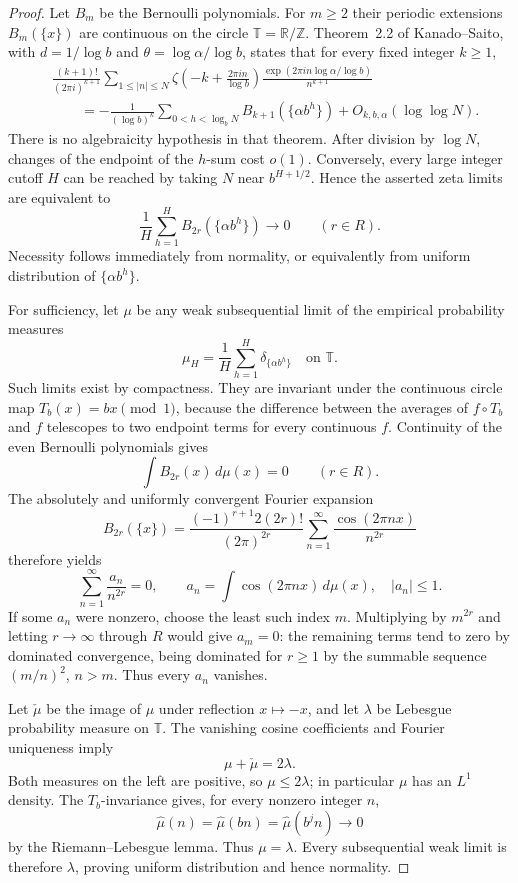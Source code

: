 \documentclass[11pt,a4paper]{article}
\theoremstyle{definition}
\theoremstyle{remark}
\numberwithin{equation}{section}
\begin{document}
\begin{proof}
Let $B_m$ be the Bernoulli polynomials.  For $m\geq2$ their periodic
extensions $B_m(\{x\})$ are continuous on the circle $\mathbb T=\mathbb R/\mathbb Z$.
Theorem~2.2 of Kanado--Saito, with
$d=1/\log b$ and $\theta=\log\alpha/\log b$, states that for every fixed
integer $k\geq1$,
\[
 \begin{aligned}
 &\frac{(k+1)!}{(2\pi i)^{k+1}}
 \sum_{1\leq|n|\leq N}
 \zeta\!\left(-k+\frac{2\pi i n}{\log b}\right)
 \frac{\exp(2\pi i n\log\alpha/\log b)}{n^{k+1}}
 \\
 &\qquad=-\frac1{(\log b)^k}
 \sum_{0<h<\log_bN}B_{k+1}(\{\alpha b^h\})
 +O_{k,b,\alpha}(\log\log N).
 \end{aligned}
\]
There is no algebraicity hypothesis in that theorem.
After division by $\log N$, changes of the endpoint of the $h$-sum cost
$o(1)$.  Conversely, every large integer cutoff $H$ can be reached by
taking $N$ near $b^{H+1/2}$.  Hence the asserted zeta limits are equivalent
to
\[
 \frac1H\sum_{h=1}^{H}B_{2r}(\{\alpha b^h\})\longrightarrow0
 \qquad(r\in R).
\]
Necessity follows immediately from normality, or equivalently from uniform
distribution of $\{\alpha b^h\}$.

For sufficiency, let $\mu$ be any weak subsequential limit of the empirical
probability measures
\[
 \mu_H=\frac1H\sum_{h=1}^{H}\delta_{\{\alpha b^h\}}
 \quad\text{on }\mathbb T.
\]
Such limits exist by compactness.  They are invariant under the continuous
circle map $T_b(x)=bx\pmod1$, because the difference between the averages
of $f\circ T_b$ and $f$ telescopes to two endpoint terms for every continuous
$f$.  Continuity of the even Bernoulli polynomials gives
\[
 \int B_{2r}(x)\,d\mu(x)=0\qquad(r\in R).
\]
The absolutely and uniformly convergent Fourier expansion
\[
 B_{2r}(\{x\})=
 \frac{(-1)^{r+1}2(2r)!}{(2\pi)^{2r}}
 \sum_{n=1}^{\infty}\frac{\cos(2\pi nx)}{n^{2r}}
\]
therefore yields
\[
 \sum_{n=1}^{\infty}\frac{a_n}{n^{2r}}=0,
 \qquad a_n=\int\cos(2\pi nx)\,d\mu(x),\quad |a_n|\leq1.
\]
If some $a_n$ were nonzero, choose the least such index $m$.
Multiplying by $m^{2r}$ and letting $r\to\infty$ through $R$ would give
$a_m=0$: the remaining terms tend to zero by dominated convergence,
being dominated for $r\geq1$ by the summable sequence $(m/n)^2$, $n>m$.
Thus every $a_n$ vanishes.

Let $\check\mu$ be the image of $\mu$ under reflection $x\mapsto-x$,
and let $\lambda$ be Lebesgue probability measure on $\mathbb T$.
The vanishing cosine coefficients and Fourier uniqueness imply
\[
 \mu+\check\mu=2\lambda.
\]
Both measures on the left are positive, so $\mu\leq2\lambda$; in particular
$\mu$ has an $L^1$ density.  The $T_b$-invariance gives, for every nonzero
integer $n$,
\[
 \widehat\mu(n)=\widehat\mu(bn)=\widehat\mu(b^j n)
   \longrightarrow0
\]
by the Riemann--Lebesgue lemma.  Thus $\mu=\lambda$.
Every subsequential weak limit is therefore $\lambda$, proving uniform
distribution and hence normality.
\end{proof}
\end{document}
